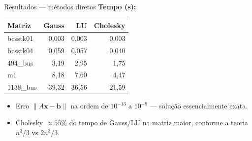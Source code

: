 \documentclass[10pt,aspectratio=169]{beamer}
\begin{document}
\begin{frame}{Resultados --- métodos diretos}
  \textbf{Tempo (s):}
  \begin{table}
  \centering
  \scriptsize
  \begin{tabular}{lrrr}
    \toprule
    \textbf{Matriz} & \textbf{Gauss} & \textbf{LU} & \textbf{Cholesky} \\
    \midrule
    bcsstk01  & 0{,}003 & 0{,}003 & 0{,}003 \\
    bcsstk04  & 0{,}059 & 0{,}057 & 0{,}040 \\
    494\_bus  & 3{,}19  & 2{,}95  & 1{,}75  \\
    m1        & 8{,}18  & 7{,}60  & \alert{4{,}47} \\
    1138\_bus & 39{,}32 & 36{,}56 & \alert{21{,}59} \\
    \bottomrule
  \end{tabular}
  \end{table}

  \vspace{0.5em}
  \begin{itemize}
    \item Erro $\|A\mathbf{x} - \mathbf{b}\|$ na ordem de $10^{-13}$ a $10^{-9}$ --- solução essencialmente exata.
    \item \alert{Cholesky $\approx 55\%$ do tempo de Gauss/LU} na matriz maior, conforme a teoria $n^3/3$ vs $2n^3/3$.
  \end{itemize}
\end{frame}
\end{document}

